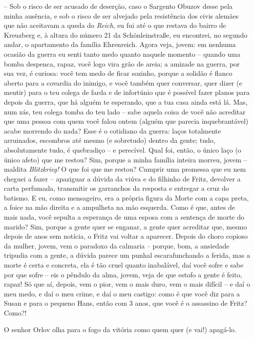 -- Sob o risco de ser acusado de deserção, caso o Sargento Obuzov desse
pela minha ausência, e sob o risco de ser alvejado pela resistência dos
civis alemães que não aceitavam a queda do \emph{Reich}, eu fui até o
que restava do bairro de Kreuzberg e, à altura do número 21 da
Schönleinstraße, eu encontrei, no segundo andar, o apartamento da
família Ehrenreich. Agora veja, jovem: em nenhuma ocasião da guerra eu
senti tanto medo quanto naquele momento -- quando uma bomba despenca,
rapaz, você logo vira grão de areia; a amizade na guerra, por sua vez, é
curiosa: você tem medo de ficar sozinho, porque a solidão é flanco
aberto para a covardia do inimigo, e você também quer conversar, quer
dizer (e mentir) para o teu colega de farda e de infortúnio que é
possível fazer planos para depois da guerra, que há alguém te esperando,
que a tua casa ainda está lá. Mas, num zás, teu colega tomba do teu lado
-- sabe aquela coisa de você não acreditar que uma pessoa com quem você
falou ontem (alguém que parecia inquebrantável) acabe morrendo do nada?
Esse é o cotidiano da guerra: laços totalmente arruinados, escombros até
mesmo (e sobretudo) dentro da gente; tudo, absolutamente tudo, é
quebradiço -- e perecível. Qual foi, então, o único laço (o único afeto)
que me restou? Sim, porque a minha família inteira morreu, jovem --
maldita \emph{Blitzkrieg!} O que foi que me restou? Cumprir uma promessa
que eu nem cheguei a fazer -- apaziguar a dúvida da viúva e do filhinho
de Fritz, devolver a carta perfumada, transmitir os garranchos da
resposta e entregar a cruz do batismo. E eu, como mensageiro, era a
própria figura da Morte com a capa preta, a foice na mão direita e a
ampulheta na mão esquerda. Como é que, antes de mais nada, você sepulta
a esperança de uma esposa com a sentença de morte do marido? Sim, porque
a gente quer se enganar, a gente quer acreditar que, mesmo depois de
anos sem notícia, o Fritz vai voltar a aparecer. Depois do choro copioso
da mulher, jovem, vem o paradoxo da calmaria -- porque, bom, a ansiedade
tripudia com a gente, a dúvida parece um punhal escarafunchando a
ferida, mas a morte é certa e concreta, ela é tão cruel quanto
inabalável, daí você sofre e sabe por que sofre -- eis o pêndulo da
alma, jovem, veja de que estofo a gente é feito, rapaz! Só que aí,
depois, vem o pior, vem o mais duro, vem o mais difícil -- e daí o meu
medo, e daí o meu crime, e daí o meu castigo: como é que você diz para a
Susan e para o pequeno Hans, então com 3 anos, que você é o assassino de
Fritz? Como?!

O senhor Orlov olha para o fogo da vitória como quem quer (e vai!)
apagá-lo.


